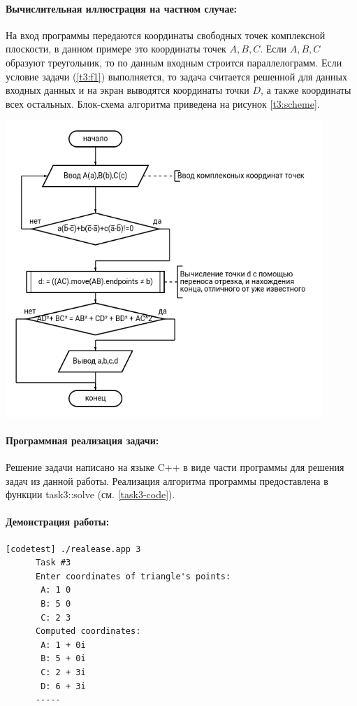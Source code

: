 {   \paragraph{Вычислительная иллюстрация на частном случае:}
   На вход программы передаются координаты свободных точек комплексной плоскости, в данном примере это координаты
   точек \(A,B,C\). Если \(A,B,C\) образуют треугольник, то по данным входным строится параллелограмм. Если
   условие задачи (\ref{t3:f1}) выполняется, то задача считается решенной для данных входных данных и на экран
   выводятся координаты точки \(D\), а также координаты всех остальных. Блок-схема алгоритма приведена
   на рисунок \ref{t3:scheme}.
   \begin{center}
      \includegraphics[width=0.9\textwidth]{images/task3-diagram.png}
      \label{t3:scheme}
   \end{center}
   \paragraph{Программная реализация задачи:}
   Решение задачи написано на языке C++ в виде части программы для решения задач из данной работы.
   Реализация алгоритма программы предоставлена в функции task3::solve (см. \ref{task3-code}).
   \paragraph{Демонстрация работы:}
   \vphantom{code}
   \begin{lstlisting}[language={},frame=none]
      [codetest] ./realease.app 3
      Task #3
      Enter coordinates of triangle's points:
       A: 1 0
       B: 5 0
       C: 2 3
      Computed coordinates:
       A: 1 + 0i
       B: 5 + 0i
       C: 2 + 3i
       D: 6 + 3i
      -----
   \end{lstlisting}
}
